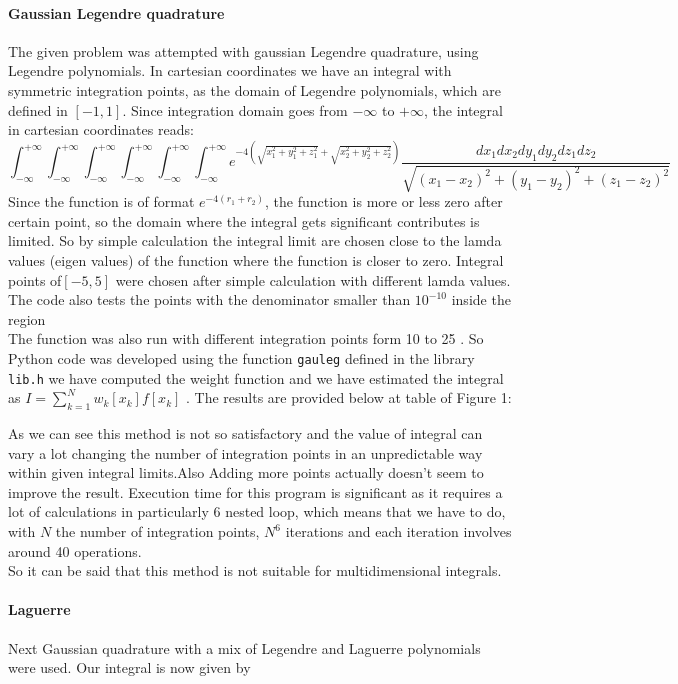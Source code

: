 \documentclass[9pt,a4paper,titlepage]{article}
\begin{document}
\paragraph{Gaussian Legendre quadrature}The given problem was attempted with gaussian Legendre quadrature, using Legendre polynomials. In cartesian coordinates we have an integral with symmetric integration points, as the domain of Legendre polynomials, which are defined in $[-1,1]$. Since integration domain goes from $-\infty$ to $+\infty$, the integral in cartesian coordinates reads:\begin{equation} \int_{-\infty}^{+\infty}\int_{-\infty}^{+\infty}\int_{-\infty}^{+\infty}\int_{-\infty}^{+\infty}\int_{-\infty}^{+\infty}\int_{-\infty}^{+\infty}e^{-4(
\sqrt{x_1^2+y_1^2+z_1^2}+ \sqrt{x_2^2+y_2^2+z_2^2})}\frac{dx_1dx_2dy_1dy_2dz_1dz_2}{\sqrt{(x_1-x_2)^2+(y_1-y_2)^2+(z_1-z_2)^2}}
\end{equation}
Since the function is of format  $e^{-4(r_1+r_2)}$,  the function is more or less zero after certain point, so the domain where the integral gets significant contributes is limited. 
So by simple calculation the integral limit are chosen close to the lamda values (eigen values)  of the function where the function is closer to zero.
Integral points of$[-5,5]$ were chosen after simple calculation with different lamda values.
The code also tests the points with the denominator smaller than $10^{-10}$ inside the region
\\
 The function was also run with different integration points form 10 to 25 . So Python code was developed using the function \cite{book3} \texttt{gauleg} defined in the library \texttt{lib.h} we have computed the weight function and we have estimated the integral as $I=  \sum_{k=1}^N w_k[x_k] f[x_k]$ 
. The results are provided below at table of Figure 1:

As we can see this method is not so satisfactory and  the value of integral can vary a lot changing the number of integration points in an unpredictable way within given integral limits.Also Adding more points actually doesn't seem to improve the result.
Execution  time for this program is significant as it  requires a lot of calculations in particularly 6 nested loop, which means that we have to do, with $N$ the number of integration points, $N^6$ iterations and each iteration involves around 40 operations.
\\
So it can be said  that this method is not suitable for multidimensional integrals.
\paragraph{Laguerre}Next Gaussian quadrature with a mix of Legendre and Laguerre polynomials were used. Our integral is now given by 
\end{document}
